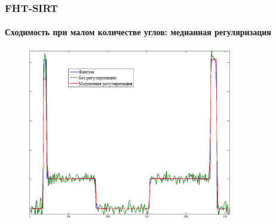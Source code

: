 \documentclass[12pt]{beamer}
\begin{document}
\begin{frame}
\frametitle{FHT-SIRT}
\framesubtitle{Сходимость при малом количестве углов: медианная регуляризация}

\begin{figure}
\includegraphics[width=0.8\textwidth]{slice_11}
\end{figure}

\end{frame}

\end{document}

